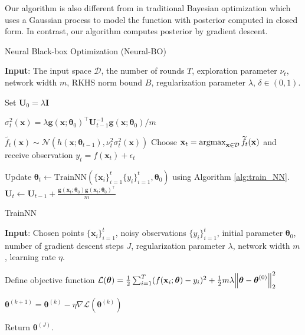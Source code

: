 Our algorithm is also different from \citet{chowdhury2017kernelized} in traditional Bayesian optimization which uses a Gaussian process to model the function with posterior computed in closed form. In contrast, our algorithm computes posterior by gradient descent. 

\begin{algorithm}[]
\caption{Neural Black-box Optimization (Neural-BO)}
\label{alg:Neural-BO}
\textbf{Input}: The input space $\mathcal D$, the number of rounds $T$, exploration parameter $\nu_t$, network width $m$, RKHS norm bound $B$, regularization parameter $\lambda$, $\delta \in (0,1)$.
\begin{algorithmic}[1]
\State Set $\mathbf{U}_0 = \lambda \mathbf{I}$ 

\State $\sigma^2_t (\mathbf{x}) = \lambda \mathbf{g}(\mathbf{x};\boldsymbol{\theta}_0)^\top\mathbf{U}_{t-1}^{-1}\mathbf{g}(\mathbf{x};\boldsymbol{\theta}_0)/m$ \label{line:calculate_var}

\State $\widetilde{f_t}(\mathbf{x}) \sim \mathcal{N}(h(\mathbf{x}; \boldsymbol{\theta}_{t-1}), \nu_t^2 \sigma^2_t(\mathbf{x}))$ 
\State Choose $\mathbf{x}_t = \operatorname*{argmax}_{\mathbf{x} \in \mathcal{D}} \widetilde{f_t}(\mathbf{x}) $ and receive observation $y_t = f(\mathbf{x}_t) + \epsilon_t$ 
   
\State Update $\boldsymbol{\theta}_t \leftarrow \text{TrainNN}(\{\mathbf{x}_i\}^t_{i=1} \{y_i\}^t_{i=1}, \boldsymbol{\theta}_0)$ using Algorithm \ref{alg:train_NN}. \label{line:train_NN}
\State $\mathbf{U}_t \leftarrow \mathbf{U}_{t-1} +  \frac{\mathbf{g}(\mathbf{x}_t;\boldsymbol{\theta}_0)\mathbf{g}(\mathbf{x}_t; \boldsymbol{\theta}_0)^\top}{m} $ \label{line:update_Ut}
\EndFor
\end{algorithmic}
\end{algorithm}

\begin{algorithm}[H]
\caption{TrainNN}
\label{alg:train_NN}
\textbf{Input}: Chosen points $\{\mathbf{x}_i\}^t_{i=1}$, noisy observations $\{y_i\}^t_{i=1}$, initial parameter $\boldsymbol{\theta}_0$, number of gradient descent steps $J$, regularization parameter $\lambda$, network width $m$, learning rate $\eta$.
\begin{algorithmic}[1]
\State Define objective function $\mathcal{L}(\boldsymbol{\theta})  = \frac{1}{2}\sum^T_{i=1} (f(\mathbf{x}_i; \boldsymbol{\theta}) - y_i)^2 + \frac{1}{2}m\lambda\norm{\boldsymbol{\theta} - \boldsymbol{\theta}^{(0)}}^2_2$

$\boldsymbol{\theta}^{(k+1)} = \boldsymbol{\theta}^{(k)} - \eta \nabla \mathcal{L}(\boldsymbol{\theta}^{(k)})$
\EndFor

\State Return $\boldsymbol{\theta}^{(J)}$.
\end{algorithmic}
\end{algorithm}


